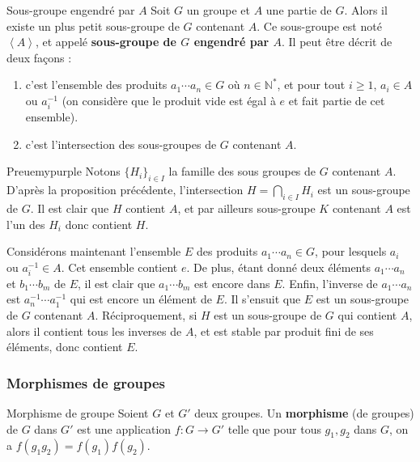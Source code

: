     \begin{defitheo}{Sous-groupe engendré par $A$}{}
        Soit $G$ un groupe et $A$ une partie de $G$. Alors il existe un plus petit sous-groupe de $G$ contenant $A$. Ce sous-groupe est noté $\left< A\right>$, et appelé \textbf{sous-groupe de $G$ engendré par $A$}. Il peut être décrit de deux façons :
        \begin{enumerate}
            \item c’est l’ensemble des produits $a_1 \cdots a_n \in G$ où $n \in \mathbb{N}^*$, et pour tout $i \geq 1$, $a_i \in A$ ou $a_{i}^{-1}$ (on considère que le produit vide est égal à $e$ et fait partie de cet ensemble).
            \item c’est l’intersection des sous-groupes de $G$ contenant $A$.
        \end{enumerate}
    \end{defitheo}

    \begin{demo}{Preue}{mypurple}
        Notons $\big\{ H_i \big\}_{i \in I}$ la famille des sous groupes de $G$ contenant $A$. D’après la proposition précédente, l’intersection $H = \bigcap_{i \in I} H_i$ est un sous-groupe de $G$. Il est clair que $H$ contient $A$, et par ailleurs sous-groupe $K$ contenant $A$ est l’un des $H_i$ donc contient $H$. 

        Considérons maintenant l’ensemble $E$ des produits $a_1\cdots a_n \in G$, pour lesquels $a_i$ ou $a_i^{-1} \in A$. Cet ensemble contient $e$. De plus, étant donné deux éléments $a_1\cdots a_n$ et $b_1 \cdots b_m$ de $E$, il est clair que $a_1 \cdots b_m$ est encore dans $E$. Enfin, l’inverse de $a_1 \cdots a_n$ est $a_n^{-1} \cdots a_1^{-1}$ qui est encore un élément de $E$. Il s’ensuit que $E$ est un sous-groupe de $G$ contenant $A$. Réciproquement, si $H$ est un sous-groupe de $G$ qui contient $A$, alors il contient tous les inverses de $A$, et est stable par produit fini de ses éléments, donc contient $E$.
    \end{demo}

    \subsubsection{Morphismes de groupes}

    \begin{defi}{Morphisme de groupe}{}
        Soient $G$ et $G'$ deux groupes. Un \textbf{morphisme} (de groupes) de $G$ dans $G'$ est une application $f : G \to G'$ telle que pour tous $g_1,g_2$ dans $G$, on a $f(g_1 g_2) = f(g_1)f(g_2)$.
    \end{defi}

